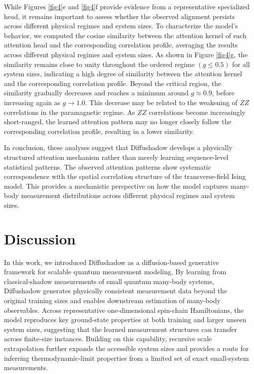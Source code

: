 \documentclass[pdflatex,sn-mathphys-num]{sn-jnl}%
\theoremstyle{thmstyleone}%
\theoremstyle{thmstyletwo}%
\theoremstyle{thmstylethree}%
\begin{document}
While Figures \ref{fig4}e and \ref{fig4}f provide evidence from a representative specialized head, it remains important to assess whether the observed alignment persists across different physical regimes and system sizes. To characterize the model's behavior, we computed the cosine similarity between the attention kernel of each attention head and the corresponding correlation profile, averaging the results across different physical regimes and system sizes. As shown in Figure \ref{fig4}g, the similarity remains close to unity throughout the ordered regime $(g\leq 0.5)$ for all system sizes, indicating a high degree of similarity between the attention kernel and the corresponding correlation profile. Beyond the critical region, the similarity gradually decreases and reaches a minimum around $g \approx 0.9$, before increasing again as $g\to1.0$.
This decrease may be related to the weakening of $ZZ$ correlations in the paramagnetic regime. As $ZZ$ correlations become increasingly short-ranged, the learned attention pattern may no longer closely follow the corresponding correlation profile, resulting in a lower similarity.

In conclusion, these analyses suggest that Diffushadow develops a physically structured attention mechanism rather than merely learning sequence-level statistical patterns. The observed attention patterns show systematic correspondence with the spatial correlation structure of the transverse-field Ising model. This provides a mechanistic perspective on how the model captures many-body measurement distributions across different physical regimes and system sizes.

\section{Discussion}\label{sec12}

In this work, we introduced Diffushadow as a diffusion-based generative framework for scalable quantum measurement modeling. By learning from classical-shadow measurements of small quantum many-body systems, Diffushadow generates physically consistent measurement data beyond the original training sizes and enables downstream estimation of many-body observables. Across representative one-dimensional spin-chain Hamiltonians, the model reproduces key ground-state properties at both training and larger unseen system sizes, suggesting that the learned measurement structures can transfer across finite-size instances. Building on this capability, recursive scale extrapolation further expands the accessible system sizes and provides a route for inferring thermodynamic-limit properties from a limited set of exact small-system measurements.
\end{document}
